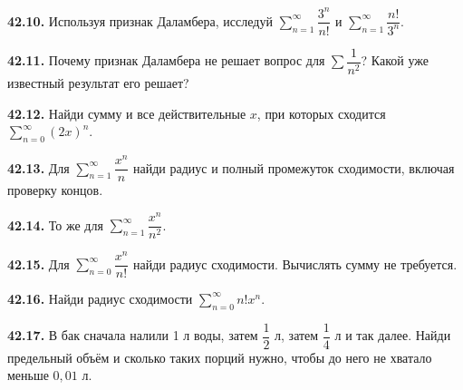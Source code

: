 \noindent\begin{minipage}[t]{\linewidth}\textbf{42.10.} Используя признак Даламбера, исследуй \(\sum_{n=1}^\infty\dfrac{3^n}{n!}\) и \(\sum_{n=1}^\infty\dfrac{n!}{3^n}\).\par\end{minipage}\par
\noindent\begin{minipage}[t]{\linewidth}\textbf{42.11.} Почему признак Даламбера не решает вопрос для \(\sum\dfrac1{n^2}\)? Какой уже известный результат его решает?\par\end{minipage}\par
\noindent\begin{minipage}[t]{\linewidth}\textbf{42.12.} Найди сумму и все действительные \(x\), при которых сходится \(\sum_{n=0}^\infty(2x)^n\).\par\end{minipage}\par
\noindent\begin{minipage}[t]{\linewidth}\textbf{42.13.} Для \(\sum_{n=1}^\infty\dfrac{x^n}{n}\) найди радиус и полный промежуток сходимости, включая проверку концов.\par\end{minipage}\par
\noindent\begin{minipage}[t]{\linewidth}\textbf{42.14.} То же для \(\sum_{n=1}^\infty\dfrac{x^n}{n^2}\).\par\end{minipage}\par
\noindent\begin{minipage}[t]{\linewidth}\textbf{42.15.} Для \(\sum_{n=0}^\infty\dfrac{x^n}{n!}\) найди радиус сходимости. Вычислять сумму не требуется.\par\end{minipage}\par
\noindent\begin{minipage}[t]{\linewidth}\textbf{42.16.} Найди радиус сходимости \(\sum_{n=0}^\infty n!x^n\).\par\end{minipage}\par
\noindent\begin{minipage}[t]{\linewidth}\textbf{42.17.} В бак сначала налили 1 л воды, затем \(\dfrac12\) л, затем \(\dfrac14\) л и так далее. Найди предельный объём и сколько таких порций нужно, чтобы до него не хватало меньше \(0{,}01\) л.\par\end{minipage}\par
